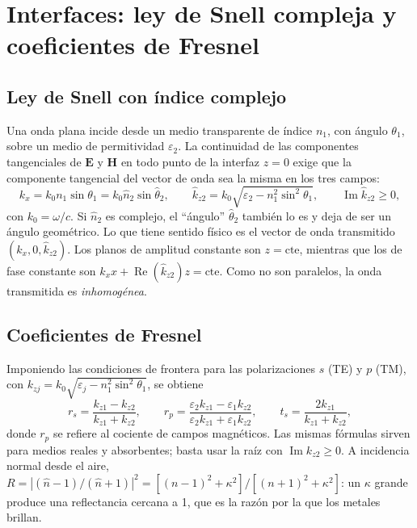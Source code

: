\documentclass[11pt,letterpaper]{article}
\newcommand{\nh}{\hat{n}}
\newcommand{\kh}{\hat{k}}
\newcommand{\eps}{\varepsilon}
\renewcommand{\Re}{\operatorname{Re}}
\renewcommand{\Im}{\operatorname{Im}}
\begin{document}
\section{Interfaces: ley de Snell compleja y coeficientes de Fresnel}\label{sec:interfaces}

\subsection{Ley de Snell con índice complejo}

Una onda plana incide desde un medio transparente de índice $n_1$, con ángulo
$\theta_1$, sobre un medio de permitividad $\eps_2$. La continuidad de las
componentes tangenciales de $\mathbf{E}$ y $\mathbf{H}$ en todo punto de la
interfaz $z=0$ exige que la componente tangencial del vector de onda sea la
misma en los tres campos:
\begin{equation}\label{eq:snell}
  k_x=k_0n_1\sin\theta_1=k_0\nh_2\sin\hat\theta_2,\qquad
  \kh_{z2}=k_0\sqrt{\eps_2-n_1^2\sin^2\theta_1},\qquad
  \Im\kh_{z2}\ge0,
\end{equation}
con $k_0=\omega/c$. Si $\nh_2$ es complejo, el ``ángulo'' $\hat\theta_2$
también lo es y deja de ser un ángulo geométrico. Lo que tiene sentido físico
es el vector de onda transmitido $(k_x,0,\kh_{z2})$. Los planos de amplitud
constante son $z=\text{cte}$, mientras que los de fase constante son
$k_xx+\Re(\kh_{z2})z=\text{cte}$. Como no son paralelos, la onda transmitida es
\emph{inhomogénea}.

\subsection{Coeficientes de Fresnel}

Imponiendo las condiciones de frontera para las polarizaciones $s$ (TE) y $p$
(TM), con $k_{zj}=k_0\sqrt{\eps_j-n_1^2\sin^2\theta_1}$, se obtiene
\begin{equation}\label{eq:fresnel}
  r_s=\frac{k_{z1}-k_{z2}}{k_{z1}+k_{z2}},\qquad
  r_p=\frac{\eps_2k_{z1}-\eps_1k_{z2}}{\eps_2k_{z1}+\eps_1k_{z2}},\qquad
  t_s=\frac{2k_{z1}}{k_{z1}+k_{z2}},
\end{equation}
donde $r_p$ se refiere al cociente de campos magnéticos. Las mismas fórmulas
sirven para medios reales y absorbentes; basta usar la raíz con
$\Im k_{z2}\ge0$. A incidencia normal desde el aire,
$R=|(\nh-1)/(\nh+1)|^2=[(n-1)^2+\kappa^2]/[(n+1)^2+\kappa^2]$: un $\kappa$
grande produce una reflectancia cercana a 1, que es la razón por la que los
metales brillan.
\end{document}
